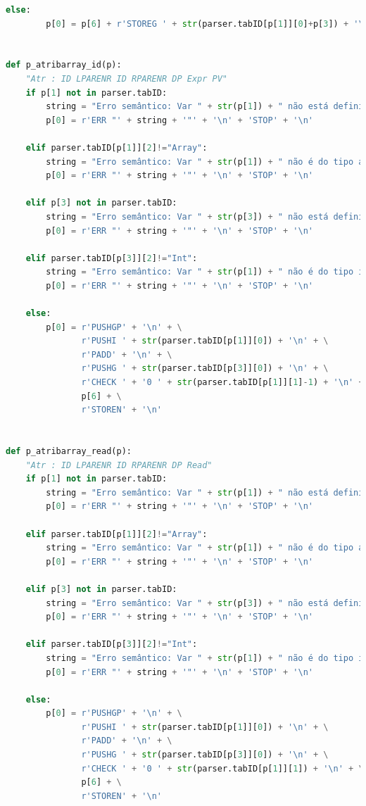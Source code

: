\documentclass{article}
\begin{document}
\begin{lstlisting}[language=Python]
    else:
        p[0] = p[6] + r'STOREG ' + str(parser.tabID[p[1]][0]+p[3]) + '\n'


def p_atribarray_id(p):
    "Atr : ID LPARENR ID RPARENR DP Expr PV"
    if p[1] not in parser.tabID:
        string = "Erro semântico: Var " + str(p[1]) + " não está definida!"
        p[0] = r'ERR "' + string + '"' + '\n' + 'STOP' + '\n'

    elif parser.tabID[p[1]][2]!="Array":
        string = "Erro semântico: Var " + str(p[1]) + " não é do tipo array!"
        p[0] = r'ERR "' + string + '"' + '\n' + 'STOP' + '\n'

    elif p[3] not in parser.tabID:
        string = "Erro semântico: Var " + str(p[3]) + " não está definida!"
        p[0] = r'ERR "' + string + '"' + '\n' + 'STOP' + '\n'

    elif parser.tabID[p[3]][2]!="Int":
        string = "Erro semântico: Var " + str(p[1]) + " não é do tipo inteiro!"
        p[0] = r'ERR "' + string + '"' + '\n' + 'STOP' + '\n'

    else:
        p[0] = r'PUSHGP' + '\n' + \
               r'PUSHI ' + str(parser.tabID[p[1]][0]) + '\n' + \
               r'PADD' + '\n' + \
               r'PUSHG ' + str(parser.tabID[p[3]][0]) + '\n' + \
               r'CHECK ' + '0 ' + str(parser.tabID[p[1]][1]-1) + '\n' + \
               p[6] + \
               r'STOREN' + '\n'


def p_atribarray_read(p):
    "Atr : ID LPARENR ID RPARENR DP Read"
    if p[1] not in parser.tabID:
        string = "Erro semântico: Var " + str(p[1]) + " não está definida!"
        p[0] = r'ERR "' + string + '"' + '\n' + 'STOP' + '\n'

    elif parser.tabID[p[1]][2]!="Array":
        string = "Erro semântico: Var " + str(p[1]) + " não é do tipo array!"
        p[0] = r'ERR "' + string + '"' + '\n' + 'STOP' + '\n'

    elif p[3] not in parser.tabID:
        string = "Erro semântico: Var " + str(p[3]) + " não está definida!"
        p[0] = r'ERR "' + string + '"' + '\n' + 'STOP' + '\n'

    elif parser.tabID[p[3]][2]!="Int":
        string = "Erro semântico: Var " + str(p[1]) + " não é do tipo inteiro!"
        p[0] = r'ERR "' + string + '"' + '\n' + 'STOP' + '\n'

    else:
        p[0] = r'PUSHGP' + '\n' + \
               r'PUSHI ' + str(parser.tabID[p[1]][0]) + '\n' + \
               r'PADD' + '\n' + \
               r'PUSHG ' + str(parser.tabID[p[3]][0]) + '\n' + \
               r'CHECK ' + '0 ' + str(parser.tabID[p[1]][1]) + '\n' + \
               p[6] + \
               r'STOREN' + '\n'



\end{lstlisting}
\end{document}
